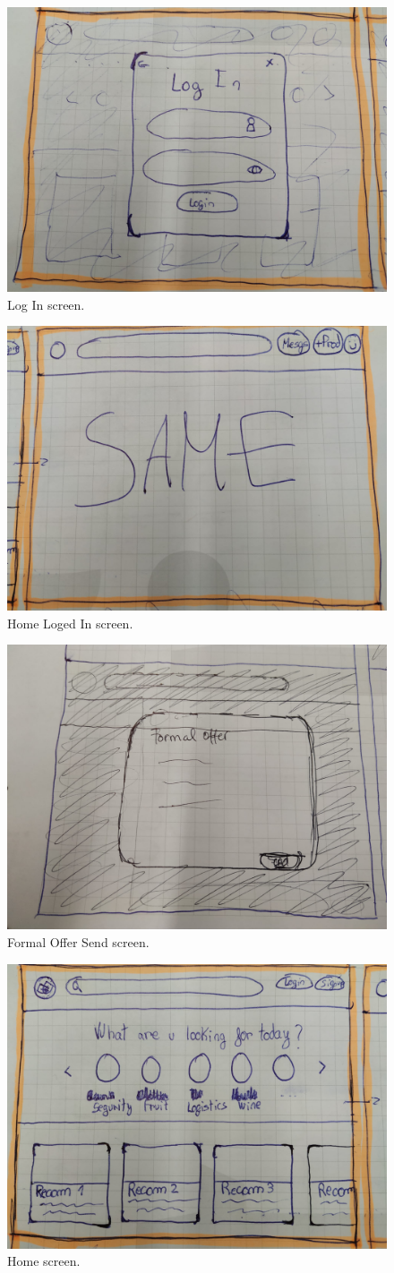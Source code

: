 \documentclass[./main.tex]{subfiles}
\begin{document}
\begin{figure}[H]
  \centering
  \includegraphics[width=0.5\linewidth]{img/webwire_8.jpeg}
  \caption{Log In screen.}
  \label{fig:webwire-screen-1}
\end{figure}
\begin{figure}[H]
  \centering
  \includegraphics[width=0.5\linewidth]{img/webwire_9.jpeg}
  \caption{Home Loged In screen.}
  \label{fig:webwire-screen-1}
\end{figure}
\begin{figure}[H]
  \centering
  \includegraphics[width=0.5\linewidth]{img/webwire_10.jpeg}
  \caption{Formal Offer Send screen.}
  \label{fig:webwire-screen-1}
\end{figure}
\begin{figure}[H]
  \centering
  \includegraphics[width=0.5\linewidth]{img/webwire_11.jpeg}
  \caption{Home screen.}
  \label{fig:webwire-screen-1}
\end{figure}
\end{document}
